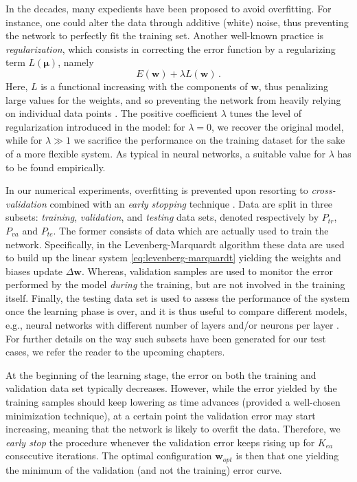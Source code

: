 \documentclass[12pt, a4paper, twoside, openright]{report}
\numberwithin{equation}{chapter}
\theoremstyle{theorem}
\theoremstyle{definition}
\theoremstyle{remark}
\theoremstyle{proposition}
\numberwithin{figure}{chapter}
\begin{document}
		In the decades, many expedients have been proposed to avoid overfitting. For instance, one could alter the data through additive (white) noise, thus preventing the network to perfectly fit the training set. Another well-known practice is \emph{regularization}, which consists in correcting the error function by a regularizing term $L(\mathbf{\mu})$, namely
		\begin{equation*}
			E(\mathbf{w}) + \lambda L(\mathbf{w}) \, .
		\end{equation*}
		Here, $L$ is a functional increasing with the components of $\mathbf{w}$, thus penalizing large values for the weights, and so preventing the network from heavily relying on individual data points \cite{Mat16}. The positive coefficient $\lambda$ tunes the level of regularization introduced in the model: for $\lambda = 0$, we recover the original model, while for $\lambda \gg 1$ we sacrifice the performance on the training dataset for the sake of a more flexible system. As typical in neural networks, a suitable value for $\lambda$ has to be found empirically. 
		
		In our numerical experiments, overfitting is prevented upon resorting to \emph{cross-validation} combined with an \emph{early stopping} technique \cite{Koh95}. Data are split in three subsets: \emph{training}, \emph{validation}, and \emph{testing} data sets, denoted respectively by $P_{tr}$, $P_{va}$ and $P_{te}$. The former consists of data which are actually used to train the network. Specifically, in the Levenberg-Marquardt algorithm these data are used to build up the linear system \eqref{eq:levenberg-marquardt} yielding the weights and biases update $\Delta \mathbf{w}$. Whereas, validation samples are used to monitor the error performed by the model \emph{during} the training, but are not involved in the training itself. Finally, the testing data set is used to assess the performance of the system once the learning phase is over, and it is thus useful to compare different models, e.g., neural networks with different number of layers and/or neurons per layer \cite{Mat16}. For further details on the way such subsets have been generated for our test cases, we refer the reader to the upcoming chapters.
		
		At the beginning of the learning stage, the error on both the training and validation data set typically decreases. However, while the error yielded by the training samples should keep lowering as time advances (provided a well-chosen minimization technique), at a certain point the validation error may start increasing, meaning that the network is likely to overfit the data. Therefore, we \emph{early stop} the procedure whenever the validation error keeps rising up for $K_{ea}$ consecutive iterations. The optimal configuration $\mathbf{w}_{opt}$ is then that one yielding the minimum of the validation (and not the training) error curve.
		
\end{document}
